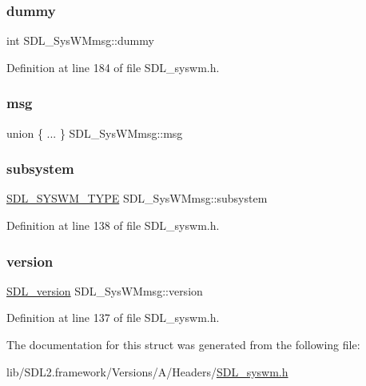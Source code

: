 \subsubsection{\texorpdfstring{dummy}{dummy}}
{\footnotesize\ttfamily int S\+D\+L\+\_\+\+Sys\+W\+Mmsg\+::dummy}



Definition at line 184 of file S\+D\+L\+\_\+syswm.\+h.

\mbox{\label{struct_s_d_l___sys_w_mmsg_a8890abd547a386afa3a822f15568c162}} 
\subsubsection{\texorpdfstring{msg}{msg}}
{\footnotesize\ttfamily union \{ ... \}   S\+D\+L\+\_\+\+Sys\+W\+Mmsg\+::msg}

\mbox{\label{struct_s_d_l___sys_w_mmsg_a7c3900af5ea797f1318fc77ee0ecd11b}} 
\subsubsection{\texorpdfstring{subsystem}{subsystem}}
{\footnotesize\ttfamily \mbox{\hyperlink{_s_d_l__syswm_8h_a064c26598287280fff2a00d6758ac4f7}{S\+D\+L\+\_\+\+S\+Y\+S\+W\+M\+\_\+\+T\+Y\+PE}} S\+D\+L\+\_\+\+Sys\+W\+Mmsg\+::subsystem}



Definition at line 138 of file S\+D\+L\+\_\+syswm.\+h.

\mbox{\label{struct_s_d_l___sys_w_mmsg_a95f9aae58d18ee8fac556416b322a5fb}} 
\subsubsection{\texorpdfstring{version}{version}}
{\footnotesize\ttfamily \mbox{\hyperlink{struct_s_d_l__version}{S\+D\+L\+\_\+version}} S\+D\+L\+\_\+\+Sys\+W\+Mmsg\+::version}



Definition at line 137 of file S\+D\+L\+\_\+syswm.\+h.



The documentation for this struct was generated from the following file\+:\begin{DoxyCompactItemize}
\item 
lib/\+S\+D\+L2.\+framework/\+Versions/\+A/\+Headers/\mbox{\hyperlink{_s_d_l__syswm_8h}{S\+D\+L\+\_\+syswm.\+h}}\end{DoxyCompactItemize}
